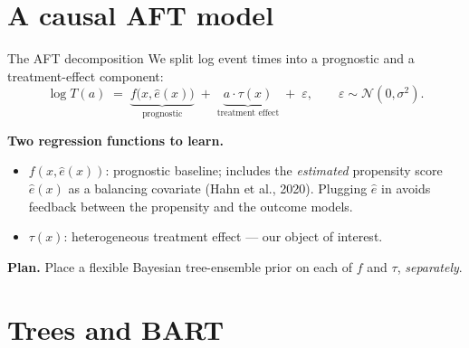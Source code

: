 \documentclass[10pt,aspectratio=169]{beamer}
\newcommand{\N}{\mathcal{N}}
\begin{document}
\section{A causal AFT model}

\begin{frame}{The AFT decomposition}
We split log event times into a prognostic and a treatment-effect component:
\[
\log T(a)
\;=\;
\underbrace{f\bigl(x, \hat e(x)\bigr)}_{\text{prognostic}}
\;+\;
\underbrace{a \cdot \tau(x)}_{\text{treatment effect}}
\;+\;
\varepsilon,
\qquad \varepsilon \sim \N(0, \sigma^2).
\]

\bigskip

\textbf{Two regression functions to learn.}
\begin{itemize}
  \item $f(x, \hat e(x))$: prognostic baseline; includes the \emph{estimated} propensity score $\hat e(x)$ as a balancing covariate (Hahn et al., 2020). Plugging $\hat e$ in avoids feedback between the propensity and the outcome models.
  \item $\tau(x)$: heterogeneous treatment effect — our object of interest.
\end{itemize}

\bigskip

\textbf{Plan.} Place a flexible Bayesian tree-ensemble prior on each of $f$ and $\tau$, \emph{separately}.
\end{frame}

\section{Trees and BART}
\end{document}

